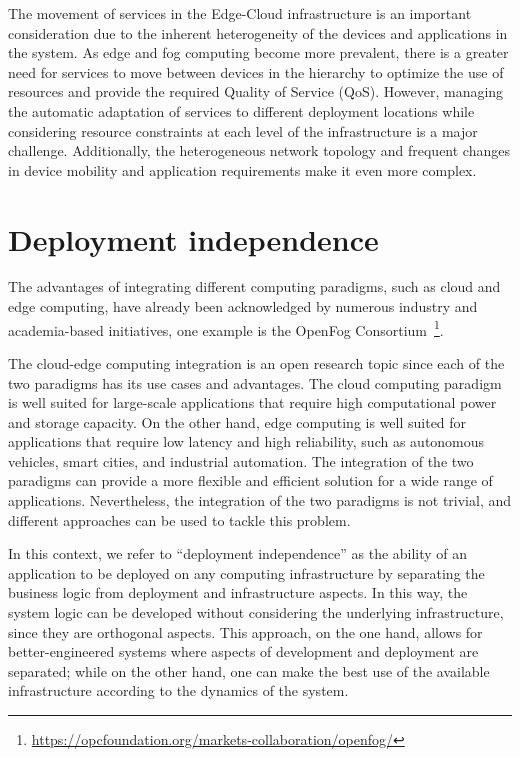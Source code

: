 The movement of services in the Edge-Cloud infrastructure is an important consideration due to the inherent heterogeneity of the devices and
applications in the system. As edge and fog computing become more prevalent, there is a greater need for services to move between devices in the
hierarchy to optimize the use of resources and provide the required Quality of Service (QoS). However, managing the automatic adaptation of
services to different deployment locations while considering resource constraints at each level of the infrastructure is a major
challenge. Additionally, the heterogeneous network topology and frequent changes in device mobility and application requirements make it even more
complex.


\section{Deployment independence}
\label{sec:deployment-independence}

The advantages of integrating different computing paradigms, such as cloud and edge computing, have already been acknowledged by numerous
industry and academia-based initiatives, one example is the OpenFog Consortium~\footnote{\url{https://opcfoundation.org/markets-collaboration/openfog/}}.

The cloud-edge computing integration is an open research topic since each of the two paradigms has its use cases and advantages. The cloud
computing paradigm is well suited for large-scale applications that require high computational power and storage capacity. On the other hand, edge
computing is well suited for applications that require low latency and high reliability, such as autonomous vehicles, smart cities, and industrial
automation. The integration of the two paradigms can provide a more flexible and efficient solution for a wide range of applications.
Nevertheless, the integration of the two paradigms is not trivial, and different approaches can be used to tackle this problem.

In this context, we refer to ``deployment independence'' as the ability of an application to be deployed on any computing infrastructure by
separating the business logic from deployment and infrastructure aspects. In this way, the system logic can be developed without considering the
underlying infrastructure, since they are orthogonal aspects. This approach, on the one hand, allows for better-engineered systems where aspects of
development and deployment are separated; while on the other hand, one can make the best use of the available infrastructure according to the
dynamics of the system.

